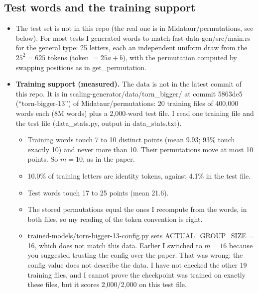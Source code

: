 \documentclass[paper=a4,fontsize=11pt,DIV=11,parskip=half,headings=small,numbers=noendperiod]{scrartcl}
\DeclareRobustCommand{\lead}[1]{\textsf{\bfseries\color{accent}#1}}
\DeclareRobustCommand{\code}[1]{{\fontseries{m}\ttfamily #1}}
\begin{document}
\subsection{Test words and the training support}\label{sec:2.3}
\begin{itemize}
\item The test set is not in this repo (the real one is in \code{Midataur/\allowbreak{}permutations}, see
  below). For most tests I generated words to match
  \code{fast-\allowbreak{}data-\allowbreak{}gen/\allowbreak{}src/\allowbreak{}main.\allowbreak{}rs} for the
  general type: 25 letters, each an independent uniform draw from the $25^2=625$ tokens (token $=25a+b$), with
  the permutation computed by swapping positions as in \code{get\_\allowbreak{}permutation}.
\item \lead{Training support (measured).} The data is not in the latest commit of this repo. It is in
  \code{scaling-\allowbreak{}generator/\allowbreak{}data/\allowbreak{}torn\_\allowbreak{}bigger/} at commit
  \code{5863de5} (“torn-bigger-13”) of \code{Midataur/\allowbreak{}permutations}: 20 training files of 400,000
  words each (8M words) plus a 2,000-word test file. I read one training file and the test file
  (\code{data\_\allowbreak{}stats.\allowbreak{}py}, output in \code{data\_\allowbreak{}stats.\allowbreak{}txt}).
\begin{itemize}
\item Training words touch 7 to 10 distinct points (mean 9.93; 93\% touch exactly 10) and never more than 10.
  Their permutations move at most 10 points. So $m=10$, as in the paper.
\item 10.0\% of training letters are identity tokens, against 4.1\% in the test file.
\item Test words touch 17 to 25 points (mean 21.6).
\item The stored permutations equal the ones I recompute from the words, in both files, so my reading of the
  token convention is right.
\item
  \code{trained-\allowbreak{}models/\allowbreak{}torn-\allowbreak{}bigger-\allowbreak{}13-\allowbreak{}config.\allowbreak{}py}
  sets \code{ACTUAL\_\allowbreak{}GROUP\_\allowbreak{}SIZE = 16}, which does not match this data. Earlier I
  switched to $m=16$ because you suggested trusting the config over the paper. That was wrong: the config value
  does not describe the data. I have not checked the other 19 training files, and I cannot prove the checkpoint
  was trained on exactly these files, but it scores 2,000/2,000 on this test file.
\end{itemize}
\end{itemize}
\end{document}
